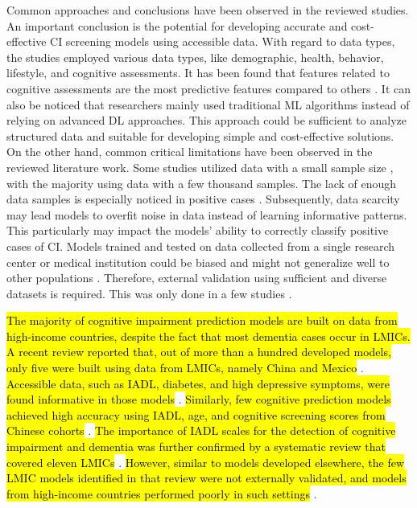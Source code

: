 Common approaches and conclusions have been observed in the reviewed studies. An important conclusion is the potential for developing accurate and cost-effective CI screening models using accessible data. With regard to data types, the studies employed various data types, like demographic, health, behavior, lifestyle, and cognitive assessments. It has been found that features related to cognitive assessments are the most predictive features compared to others \cite{Ren2025Identifying, Twait2023Dementia, Vyas2022Identifying}. It can also be noticed that researchers mainly used traditional ML algorithms instead of relying on advanced DL approaches. This approach could be sufficient to analyze structured data and suitable for developing simple and cost-effective solutions. On the other hand, common critical limitations have been observed in the reviewed literature work. Some studies utilized data with a small sample size \cite{Richter2025Cognitive}, with the majority using data with a few thousand samples. The lack of enough data samples is especially noticed in positive cases \cite{Li2023Machine, Oh2024Multivariable}. Subsequently, data scarcity may lead models to overfit noise in data instead of learning informative patterns. This particularly may impact the models' ability to correctly classify positive cases of CI. Models trained and tested on data collected from a single research center or medical institution could be biased and might not generalize well to other populations \cite{ Oh2024Multivariable, Richter2025Cognitive, Zhu2020Machine}. Therefore, external validation using sufficient and diverse datasets is required. This was only done in a few studies \cite{abbas2024Explainable, Cui2024Prediction, Danso2021Developing, Yue2023Explainable}.

\hl{The majority of cognitive impairment prediction models are built on data from high-income countries, despite the fact that most dementia cases occur in LMICs. A recent review reported that, out of more than a hundred developed models, only five were built using data from LMICs, namely China and Mexico} \cite{Alshahrani2024Dementia}. \hl{Accessible data, such as IADL, diabetes, and high depressive symptoms, were found informative in those models} \cite{Alshahrani2024Dementia}. \hl{Similarly, few cognitive prediction models achieved high accuracy using IADL, age, and cognitive screening scores from Chinese cohorts} \cite{Cui2024Prediction, Ren2025Using, Ye2025Predicting}. \hl{The importance of IADL scales for the detection of cognitive impairment and dementia was further confirmed by a systematic review that covered eleven LMICs} \cite{Yemm2021Instrumental}. \hl{However, similar to models developed elsewhere, the few LMIC models identified in that review were not externally validated, and models from high-income countries performed poorly in such settings} \cite{Alshahrani2024Dementia}.

